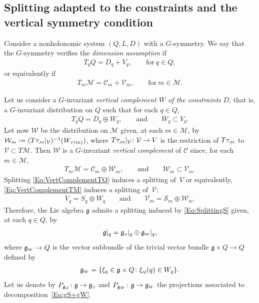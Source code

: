 \documentclass[10pt,a4paper]{amsart}
\numberwithin{equation}{section}
\def\W{\mathcal{W}}
\def\M{\mathcal{M}}
\def\V{\mathcal{V}}
\def\S{\mathcal{S}}
\def\C{\mathcal{C}}
\def\g{\mathfrak{g}}
\def\subM{{\mbox{\tiny{$\M$}}}}
\def\subSS{{\mbox{\tiny{$S$}}}}
\def\subWW{{\mbox{\tiny{$W$}}}}
\def\subQQ{{\mbox{\tiny{$Q$}}}}
\begin{document}
\subsection{Splitting adapted to the constraints and the vertical symmetry condition}

Consider a nonholonomic system $(Q,L,D)$ with a $G$-symmetry.
We say that the $G$-symmetry verif\/ies the {\it dimension assumption} if
\begin{gather} \label{Eq:DimAssumptionTQ}
 T_qQ = D_q +V_q  , \qquad \mbox{for} \ q \in Q,
\end{gather}
or equivalently if
\begin{gather*}
  T_m\M = \C_m + \V_m, \qquad \textrm{for} \ m\in \M.
\end{gather*}

Let us consider a $G$-invariant {\it vertical complement $W$ of the constraints}
$D$, that is, a $G$-invariant distribution on $Q$ such that for each $q \in Q$,
\begin{gather}\label{Eq:VertComplementTQ}
T_qQ = D_q \oplus W_q, \qquad \mbox{and} \qquad W_q \subset V_q.
\end{gather}
Let now $\W$ be the distribution on $\M$ given, at each $m\in \M$, by
$\W_m := (T\tau_\subM|_\V)^{-1}(W_{\tau(m)})$, where $T\tau_\subM|_\V \colon \V \to V$
is the restriction of $T\tau_\subM$ to $\V\subset T\M$. Then $\W$ is a $G$-invariant
{\it vertical complement} of $\C$ since, for each $m\in\M$,
\begin{gather}\label{Eq:VertComplementTM}
T_m\M = \C_m \oplus \W_m, \qquad \mbox{and} \qquad \W_m \subset \V_m.
\end{gather}
Splitting \eqref{Eq:VertComplementTQ} induces a splitting of~$V$ or equivalently, \eqref{Eq:VertComplementTM} induces a splitting of~$\V$:
\begin{gather}\label{Eq:SplittingS}
V_q = S_q \oplus W_q \qquad \mbox{and} \qquad \V_m = \S_m \oplus \W_m.
\end{gather}
Therefore, the Lie algebra $\g$ admits a splitting induced by \eqref{Eq:SplittingS} given, at each $q\in Q$, by
\begin{gather} \label{Eq:gS+gW}
\mathfrak{g}|_q = \mathfrak{g}_\subSS |_q \oplus \mathfrak{g}_\subWW |_q,
\end{gather}
where  $\mathfrak{g}_\subWW\to Q$ is the vector subbundle of the trivial vector bundle $\mathfrak{g}\times Q \to Q$ def\/ined by
\begin{gather*} %
 \mathfrak{g}_\subWW = \{ \xi _q \in \mathfrak{g}\times Q \colon \xi_\subQQ(q) \in W_q\}.
\end{gather*}
Let us denote by $P_{\mathfrak{g}_S}\colon \mathfrak{g}\to \mathfrak{g}_\subSS$
and $P_{\mathfrak{g}_W}\colon \mathfrak{g}\to \mathfrak{g}_\subWW$  the
projections associated to decomposition~\eqref{Eq:gS+gW}.
\end{document}
